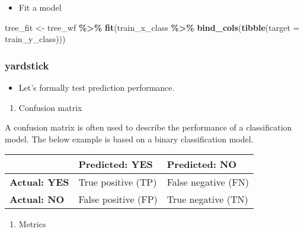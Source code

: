 \documentclass[
]{book}
\newenvironment{Shaded}{\begin{snugshade}}{\end{snugshade}}
\newcommand{\DataTypeTok}[1]{\textcolor[rgb]{0.13,0.29,0.53}{#1}}
\newcommand{\KeywordTok}[1]{\textcolor[rgb]{0.13,0.29,0.53}{\textbf{#1}}}
\newcommand{\NormalTok}[1]{#1}
\newcommand{\OperatorTok}[1]{\textcolor[rgb]{0.81,0.36,0.00}{\textbf{#1}}}
\newcommand{\StringTok}[1]{\textcolor[rgb]{0.31,0.60,0.02}{#1}}
\providecommand{\tightlist}{%
  \setlength{\itemsep}{0pt}\setlength{\parskip}{0pt}}
\begin{document}
\begin{itemize}
\tightlist
\item
  Fit a model
\end{itemize}

\begin{Shaded}
\begin{Highlighting}[]
\NormalTok{tree\_fit \textless{}{-}}\StringTok{ }\NormalTok{tree\_wf }\OperatorTok{\%\textgreater{}\%}\StringTok{ }\KeywordTok{fit}\NormalTok{(train\_x\_class }\OperatorTok{\%\textgreater{}\%}\StringTok{ }\KeywordTok{bind\_cols}\NormalTok{(}\KeywordTok{tibble}\NormalTok{(}\DataTypeTok{target =}\NormalTok{ train\_y\_class)))}
\end{Highlighting}
\end{Shaded}

\hypertarget{yardstick-1}{%
\subsubsection{yardstick}\label{yardstick-1}}

\begin{itemize}
\tightlist
\item
  Let's formally test prediction performance.
\end{itemize}

\begin{enumerate}
\def\labelenumi{\arabic{enumi}.}
\tightlist
\item
  Confusion matrix
\end{enumerate}

A confusion matrix is often used to describe the performance of a classification model. The below example is based on a binary classification model.

\begin{longtable}[]{@{}lll@{}}
\toprule
& Predicted: YES & Predicted: NO\tabularnewline
\midrule
\endhead
\textbf{Actual: YES} & True positive (TP) & False negative (FN)\tabularnewline
\textbf{Actual: NO} & False positive (FP) & True negative (TN)\tabularnewline
\bottomrule
\end{longtable}

\begin{enumerate}
\def\labelenumi{\arabic{enumi}.}
\setcounter{enumi}{1}
\tightlist
\item
  Metrics
\end{enumerate}
\end{document}
